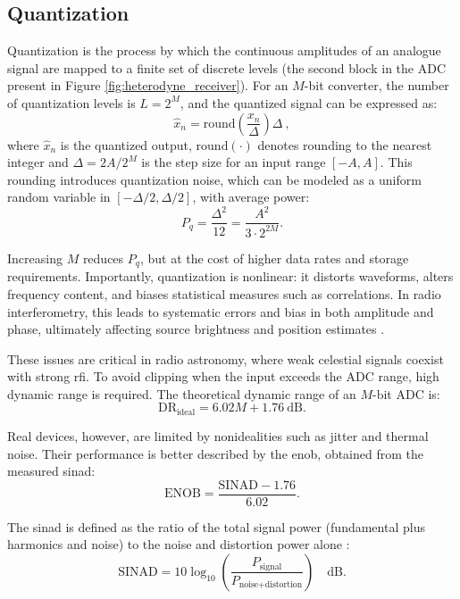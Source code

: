 \subsection{Quantization}
\label{sec:quantization}
Quantization is the process by which the continuous amplitudes of an analogue signal are mapped to a finite set of discrete levels (the second block in the ADC present in Figure \ref{fig:heterodyne_receiver}). For an $M$-bit converter, the number of quantization levels is $L = 2^M$, and the quantized signal can be expressed as:
\begin{equation}
	\hat{x}_n = \text{round}\!\left(\frac{x_n}{\Delta}\right)\Delta \ ,
\end{equation}
where $\hat{x}_n$ is the quantized output, $\text{round}(\cdot)$ denotes rounding to the nearest integer and
$\Delta = 2A / 2^M$ is the step size for an input range $[-A, A]$. This rounding introduces quantization noise, which can be modeled as a uniform random variable in $[-\Delta/2, \Delta/2]$, with average power:
\begin{equation}
	P_q = \frac{\Delta^2}{12} = \frac{A^2}{3 \cdot 2^{2M}}.
\end{equation}

Increasing $M$ reduces $P_q$, but at the cost of higher data rates and storage requirements. Importantly, quantization is nonlinear: it distorts waveforms, alters frequency content, and biases statistical measures such as correlations. In radio interferometry, this leads to systematic errors and bias in both amplitude and phase, ultimately affecting source brightness and position estimates \citep{menaparra2018quantizationbiasdigitalcorrelators}.  

These issues are critical in radio astronomy, where weak celestial signals coexist with strong \gls{rfi}. To avoid clipping when the input exceeds the ADC range, high dynamic range is required. The theoretical dynamic range of an $M$-bit ADC is:
\begin{equation}
	\text{DR}_{\text{ideal}} = 6.02M + 1.76 \ \text{dB}.
\end{equation}

Real devices, however, are limited by nonidealities such as jitter and thermal noise. Their performance is better described by the \gls{enob}, obtained from the measured \gls{sinad}:
\begin{equation}
	\text{ENOB} = \frac{\text{SINAD} - 1.76}{6.02}.
\end{equation}

The \gls{sinad} is defined as the ratio of the total signal power (fundamental plus harmonics and noise) to the noise and distortion power alone \citep{ADCStandards}:
\begin{equation}
	\text{SINAD} = 10 \log_{10} \left( \frac{P_{\text{signal}}}{P_{\text{noise+distortion}}} \right) \quad \text{dB}.
\end{equation}

